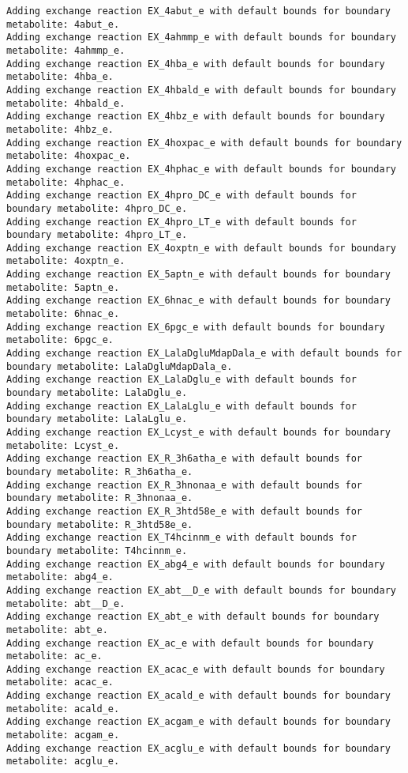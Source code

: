 \documentclass[
  letterpaper,
  DIV=11,
  numbers=noendperiod]{scrartcl}
\begin{document}
\begin{verbatim}
Adding exchange reaction EX_4abut_e with default bounds for boundary metabolite: 4abut_e.
Adding exchange reaction EX_4ahmmp_e with default bounds for boundary metabolite: 4ahmmp_e.
Adding exchange reaction EX_4hba_e with default bounds for boundary metabolite: 4hba_e.
Adding exchange reaction EX_4hbald_e with default bounds for boundary metabolite: 4hbald_e.
Adding exchange reaction EX_4hbz_e with default bounds for boundary metabolite: 4hbz_e.
Adding exchange reaction EX_4hoxpac_e with default bounds for boundary metabolite: 4hoxpac_e.
Adding exchange reaction EX_4hphac_e with default bounds for boundary metabolite: 4hphac_e.
Adding exchange reaction EX_4hpro_DC_e with default bounds for boundary metabolite: 4hpro_DC_e.
Adding exchange reaction EX_4hpro_LT_e with default bounds for boundary metabolite: 4hpro_LT_e.
Adding exchange reaction EX_4oxptn_e with default bounds for boundary metabolite: 4oxptn_e.
Adding exchange reaction EX_5aptn_e with default bounds for boundary metabolite: 5aptn_e.
Adding exchange reaction EX_6hnac_e with default bounds for boundary metabolite: 6hnac_e.
Adding exchange reaction EX_6pgc_e with default bounds for boundary metabolite: 6pgc_e.
Adding exchange reaction EX_LalaDgluMdapDala_e with default bounds for boundary metabolite: LalaDgluMdapDala_e.
Adding exchange reaction EX_LalaDglu_e with default bounds for boundary metabolite: LalaDglu_e.
Adding exchange reaction EX_LalaLglu_e with default bounds for boundary metabolite: LalaLglu_e.
Adding exchange reaction EX_Lcyst_e with default bounds for boundary metabolite: Lcyst_e.
Adding exchange reaction EX_R_3h6atha_e with default bounds for boundary metabolite: R_3h6atha_e.
Adding exchange reaction EX_R_3hnonaa_e with default bounds for boundary metabolite: R_3hnonaa_e.
Adding exchange reaction EX_R_3htd58e_e with default bounds for boundary metabolite: R_3htd58e_e.
Adding exchange reaction EX_T4hcinnm_e with default bounds for boundary metabolite: T4hcinnm_e.
Adding exchange reaction EX_abg4_e with default bounds for boundary metabolite: abg4_e.
Adding exchange reaction EX_abt__D_e with default bounds for boundary metabolite: abt__D_e.
Adding exchange reaction EX_abt_e with default bounds for boundary metabolite: abt_e.
Adding exchange reaction EX_ac_e with default bounds for boundary metabolite: ac_e.
Adding exchange reaction EX_acac_e with default bounds for boundary metabolite: acac_e.
Adding exchange reaction EX_acald_e with default bounds for boundary metabolite: acald_e.
Adding exchange reaction EX_acgam_e with default bounds for boundary metabolite: acgam_e.
Adding exchange reaction EX_acglu_e with default bounds for boundary metabolite: acglu_e.

\end{verbatim}
\end{document}
